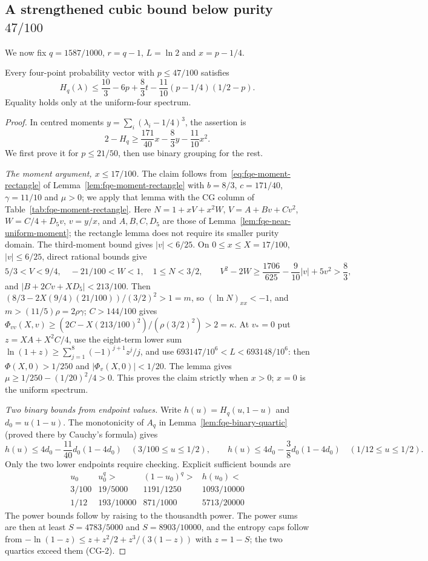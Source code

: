\subsection{A strengthened cubic bound below purity $47/100$}
\label{sec:fqe-capped-cubic}
We now fix $q=1587/1000$, $r=q-1$, $L=\ln2$ and $x=p-1/4$.
\begin{lemma}
\label{lem:fqe-capped-cubic}
Every four-point probability vector with $p\le47/100$ satisfies
\[
H_q(\lambda)\le \frac{10}3-6p+\frac83t
-\frac{11}{10}(p-1/4)(1/2-p).
\tag{CG}\label{eq:fqe-capped-cubic}
\]
Equality holds only at the uniform-four spectrum.
\end{lemma}
\begin{proof}
In centred moments $y=\sum_i(\lambda_i-1/4)^3$, the assertion is
\[
2-H_q\ge \frac{171}{40}x-\frac83y-\frac{11}{10}x^2.
\]
We first prove it for $p\le21/50$, then use binary grouping for the rest.

\emph{The moment argument, $x\le17/100$.}
The claim follows from~\eqref{eq:fqe-moment-rectangle} of Lemma~\ref{lem:fqe-moment-rectangle} with $b=8/3$,
$c=171/40$, $\gamma=11/10$ and $\mu>0$; we apply that lemma with the CG column of
Table~\ref{tab:fqe-moment-rectangle}. Here $N=1+xV+x^2W$, $V=A+Bv+Cv^2$, $W=C/4+D_5v$, $v=y/x$, and
$A,B,C,D_5$ are those of Lemma~\ref{lem:fqe-near-uniform-moment}; the rectangle lemma does not require
its smaller purity domain. The third-moment bound gives $|v|<6/25$.
On $0\le x\le X=17/100$, $|v|\le6/25$, direct rational bounds give
\[
5/3<V<9/4,\quad -21/100<W<1,\quad 1\le N<3/2,\qquad
V^2-2W\ge\frac{1706}{625}-\frac9{10}|v|+5v^2>\frac83,
\]
and $|B+2Cv+XD_5|<213/100$. Then $(8/3-2X(9/4)(21/100))/(3/2)^2>1=m$, so $(\ln N)_{xx}<-1$, and
$m>(11/5)\rho=2\rho\gamma$; $C>144/100$ gives $\Phi_{vv}(X,v)\ge(2C-X(213/100)^2)/(\rho(3/2)^2)>2=\kappa$.
At $v_*=0$ put
$z=XA+X^2C/4$, use the eight-term lower sum
$\ln(1+z)\ge\sum_{j=1}^8(-1)^{j+1}z^j/j$, and use
$693147/10^6<L<693148/10^6$: then $\Phi(X,0)>1/250$ and $|\Phi_v(X,0)|<1/20$.
The lemma gives $\mu\ge1/250-(1/20)^2/4>0$. This proves the claim strictly
when $x>0$; $x=0$ is the uniform spectrum.

\emph{Two binary bounds from endpoint values.}
Write $h(u)=H_q(u,1-u)$ and $d_0=u(1-u)$.
The monotonicity of $A_q$ in Lemma~\ref{lem:fqe-binary-quartic} (proved there by Cauchy's formula) gives
\[
 h(u)\le4d_0-\frac{11}{40}d_0(1-4d_0)\quad(3/100\le u\le1/2),
\qquad
 h(u)\le4d_0-\frac38d_0(1-4d_0)\quad(1/12\le u\le1/2).
\tag{BQ}\label{eq:fqe-capped-binary}
\]
Only the two lower endpoints require checking. Explicit sufficient bounds are
\[
\begin{array}{c|c|c|c}
u_0&u_0^q>&(1-u_0)^q>&h(u_0)<\\\hline
3/100&19/5000&1191/1250&1093/10000\\
1/12&193/10000&871/1000&5713/20000
\end{array}
\]
The power bounds follow by raising to the thousandth power. The power sums are then at least
$S=4783/5000$ and $S=8903/10000$, and the entropy caps follow from
$-\ln(1-z)\le z+z^2/2+z^3/(3(1-z))$ with $z=1-S$; the two quartics exceed them (CG-2).


\end{proof}
